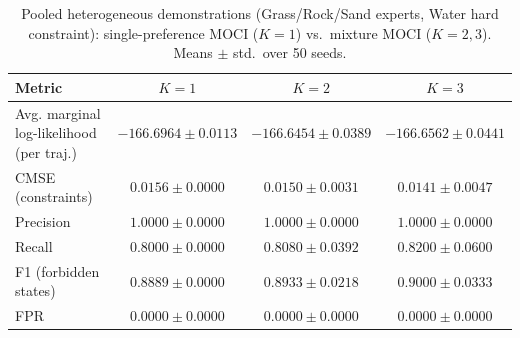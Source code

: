 \begin{table}[t]
  \centering
  \small
  \caption{Pooled heterogeneous demonstrations (Grass/Rock/Sand experts, Water hard constraint): single-preference MOCI ($K{=}1$) vs.\ mixture MOCI ($K{=}2,3$). Means $\pm$ std.\ over 50 seeds.}
  \label{tab:exp1_k_ablation_3experts}
  \begin{tabular}{lccc}
    \hline
    Metric & $K{=}1$ & $K{=}2$ & $K{=}3$ \\
    \hline
    Avg. marginal log-likelihood (per traj.) & $-166.6964 \pm 0.0113$ & $-166.6454 \pm 0.0389$ & $-166.6562 \pm 0.0441$ \\
    CMSE (constraints) & $0.0156 \pm 0.0000$ & $0.0150 \pm 0.0031$ & $0.0141 \pm 0.0047$ \\
    Precision & $1.0000 \pm 0.0000$ & $1.0000 \pm 0.0000$ & $1.0000 \pm 0.0000$ \\
    Recall & $0.8000 \pm 0.0000$ & $0.8080 \pm 0.0392$ & $0.8200 \pm 0.0600$ \\
    F1 (forbidden states) & $0.8889 \pm 0.0000$ & $0.8933 \pm 0.0218$ & $0.9000 \pm 0.0333$ \\
    FPR & $0.0000 \pm 0.0000$ & $0.0000 \pm 0.0000$ & $0.0000 \pm 0.0000$ \\
    \hline
  \end{tabular}
\end{table}
